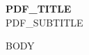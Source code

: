 \documentclass[12pt,a4paper]{article}
\begin{document}
\begin{center}
{\Huge\bfseries {{PDF_TITLE}}}\\[1ex]
{\large {{PDF_SUBTITLE}}}
\end{center}

\bigskip

{{BODY}}
\end{document}
